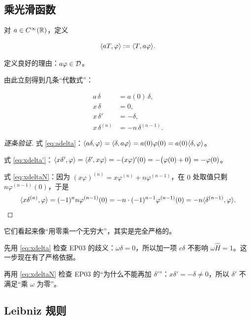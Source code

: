 \subsection{乘光滑函数}

对 $a\in C^{\infty}(\mathbb{R})$，定义

\begin{equation}
\langle aT,\varphi\rangle:=\langle T,a\varphi\rangle .
\end{equation}

定义良好的理由：$a\varphi\in\mathcal{D}$。

由此立刻得到几条“代数式”：

\begin{align}
a\,\delta&=a(0)\,\delta, \label{eq:adelta}\\
x\,\delta&=0, \label{eq:xdelta}\\
x\,\delta'&=-\delta, \label{eq:xdelta'}\\
x\,\delta^{(n)}&=-n\,\delta^{(n-1)} . \label{eq:xdeltaN}
\end{align}

\begin{proof}[逐条验证]
式 \eqref{eq:adelta}：$\langle a\delta,\varphi\rangle=\langle \delta,a\varphi\rangle=a(0)\varphi(0)=a(0)\langle \delta,\varphi\rangle$。

式 \eqref{eq:xdelta'}：$\langle x\delta',\varphi\rangle=\langle \delta',x\varphi\rangle=-(x\varphi)'(0)=-\big(\varphi(0)+0\big)=-\varphi(0)$。

式 \eqref{eq:xdeltaN}：因为 $(x\varphi)^{(n)}=x\varphi^{(n)}+n\varphi^{(n-1)}$，在 $0$ 处取值只剩 $n\varphi^{(n-1)}(0)$，于是
\begin{equation}
\langle x\delta^{(n)},\varphi\rangle=(-1)^{n}n\varphi^{(n-1)}(0)=-n\cdot(-1)^{n-1}\varphi^{(n-1)}(0)=-n\langle \delta^{(n-1)},\varphi\rangle.
\end{equation}
\end{proof}

\begin{ideabox}[$x\delta=0$ 与 $x\delta'=-\delta$ 是两道最好的练习题]
它们看起来像“用零乘一个无穷大”，其实是完全严格的。

先用 \eqref{eq:xdelta} 检查 EP03 的歧义：$\omega\delta=0$，所以加一项 $c\delta$ 不影响 $\omega\hat H=1$。这一步现在有了严格依据。

再用 \eqref{eq:xdeltaN} 检查 EP03 的“为什么不能再加 $\delta'$”：$x\delta'=-\delta\neq0$，所以 $\delta'$ 不满足“乘 $\omega$ 为零”。
\end{ideabox}

\subsection{Leibniz 规则}


